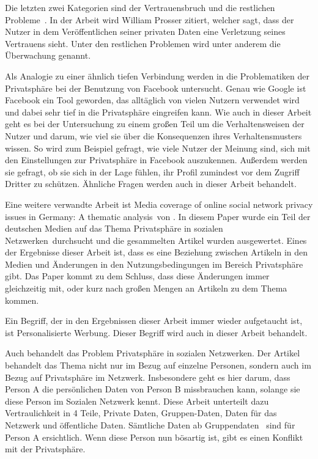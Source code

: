 Die letzten zwei Kategorien sind der Vertrauensbruch und die \glqq restlichen Probleme\grqq\ . In der Arbeit wird William Prosser zitiert, welcher sagt, dass der Nutzer in dem Veröffentlichen seiner privaten Daten eine Verletzung seines Vertrauens sieht. Unter den restlichen Problemen wird unter anderem die Überwachung genannt.

Als Analogie zu einer ähnlich tiefen Verbindung werden in \citet{debatin2009facebook} die Problematiken der Privatsphäre bei der Benutzung von Facebook untersucht. Genau wie Google ist Facebook ein Tool geworden, das alltäglich von vielen Nutzern verwendet wird und dabei sehr tief in die Privatsphäre eingreifen kann. Wie auch in dieser Arbeit geht es bei der Untersuchung zu einem großen Teil um die Verhaltensweisen der Nutzer und darum, wie viel sie über die Konsequenzen ihres Verhaltensmusters wissen. So wird zum Beispiel gefragt, wie viele Nutzer der Meinung sind, sich mit den Einstellungen zur Privatsphäre in Facebook auszukennen. Außerdem werden sie gefragt, ob sie sich in der Lage fühlen, ihr Profil zumindest vor dem Zugriff Dritter zu schützen. Ähnliche Fragen werden auch in dieser Arbeit behandelt.


Eine weitere verwandte Arbeit ist \glqq Media coverage of online social network privacy issues in Germany: A thematic analysis\grqq\ von \citet{rizk2009media}. In diesem Paper wurde ein Teil der deutschen Medien auf das Thema \glqq Privatsphäre in sozialen Netzwerken\grqq\ durchsucht und die gesammelten Artikel wurden ausgewertet. Eines der Ergebnisse dieser Arbeit ist, dass es eine Beziehung zwischen Artikeln in den Medien und Änderungen in den Nutzungsbedingungen im Bereich Privatsphäre gibt. Das Paper kommt zu dem Schluss, dass diese Änderungen immer gleichzeitig mit, oder kurz nach großen Mengen an Artikeln zu dem Thema kommen.

Ein Begriff, der in den Ergebnissen dieser Arbeit immer wieder aufgetaucht ist, ist \glqq Personalisierte Werbung\grqq . Dieser Begriff wird auch in dieser Arbeit behandelt.


Auch \citet{Preibusch2007Ubiquitous} behandelt das Problem Privatsphäre in sozialen Netzwerken. Der Artikel behandelt das Thema nicht nur im Bezug auf einzelne Personen, sondern auch im Bezug auf Privatsphäre im Netzwerk. Insbesondere geht es hier darum, dass Person A die persönlichen Daten von Person B missbrauchen kann, solange sie diese Person im Sozialen Netzwerk kennt. Diese Arbeit unterteilt dazu Vertraulichkeit in 4 Teile, Private Daten, Gruppen-Daten, Daten für das Netzwerk und öffentliche Daten. Sämtliche Daten ab \glqq Gruppendaten \grqq\ sind für Person A ersichtlich. Wenn diese Person nun bösartig ist, gibt es einen Konflikt mit der Privatsphäre. 

